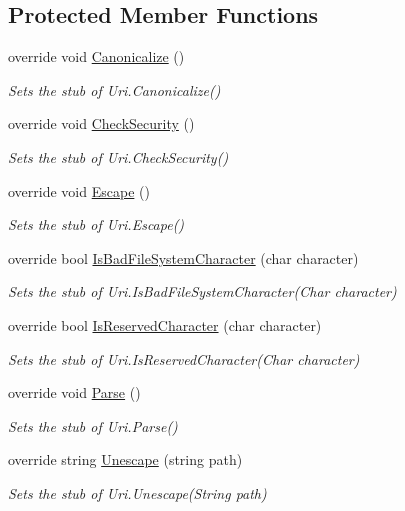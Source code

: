 \subsection*{Protected Member Functions}
\begin{DoxyCompactItemize}
\item 
override void \hyperlink{class_system_1_1_fakes_1_1_stub_uri_a9c472e9f38b024aa9689cb086e93cd73}{Canonicalize} ()
\begin{DoxyCompactList}\small\item\em Sets the stub of Uri.\-Canonicalize()\end{DoxyCompactList}\item 
override void \hyperlink{class_system_1_1_fakes_1_1_stub_uri_a6567a87c48377797698ccb089a85ce97}{Check\-Security} ()
\begin{DoxyCompactList}\small\item\em Sets the stub of Uri.\-Check\-Security()\end{DoxyCompactList}\item 
override void \hyperlink{class_system_1_1_fakes_1_1_stub_uri_a4e03451b93d51654fcf88bf6080fc09e}{Escape} ()
\begin{DoxyCompactList}\small\item\em Sets the stub of Uri.\-Escape()\end{DoxyCompactList}\item 
override bool \hyperlink{class_system_1_1_fakes_1_1_stub_uri_a376c5e97de9e70c37b883ae1a685aa9c}{Is\-Bad\-File\-System\-Character} (char character)
\begin{DoxyCompactList}\small\item\em Sets the stub of Uri.\-Is\-Bad\-File\-System\-Character(\-Char character)\end{DoxyCompactList}\item 
override bool \hyperlink{class_system_1_1_fakes_1_1_stub_uri_a82a5597fc46896cbf76387f890600ec3}{Is\-Reserved\-Character} (char character)
\begin{DoxyCompactList}\small\item\em Sets the stub of Uri.\-Is\-Reserved\-Character(\-Char character)\end{DoxyCompactList}\item 
override void \hyperlink{class_system_1_1_fakes_1_1_stub_uri_ac6ccca0c04b9c50ffece5598c1532129}{Parse} ()
\begin{DoxyCompactList}\small\item\em Sets the stub of Uri.\-Parse()\end{DoxyCompactList}\item 
override string \hyperlink{class_system_1_1_fakes_1_1_stub_uri_add177a0e549f40ed9a61e032c544f924}{Unescape} (string path)
\begin{DoxyCompactList}\small\item\em Sets the stub of Uri.\-Unescape(\-String path)\end{DoxyCompactList}\end{DoxyCompactItemize}

